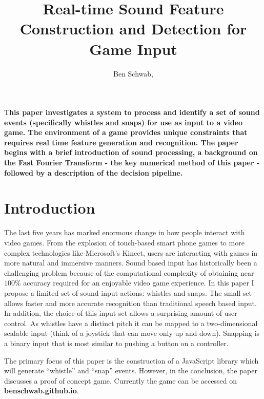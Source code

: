 \documentclass[DIV=calc, paper=a4, fontsize=11pt, twocolumn]{scrartcl}   %
\title{Real-time Sound Feature Construction and Detection for Game Input } %
\author{Ben Schwab, } %
\date{} %
\newcommand{\initial}[1]{ %
\lettrine[lines=3,lhang=0.3,nindent=0em]{
\color{DarkGoldenrod}
{\textsf{#1}}}{}}
\begin{document}
\maketitle %

\thispagestyle{fancy} %


\initial{T}\textbf{his paper investigates a system to process and identify a set of sound events (specifically whistles and snaps) for use as input to a video game. The environment of a game provides unique constraints that requires real time feature generation and recognition. The paper begins with a brief introduction of sound processing, a background on the Fast Fourier Transform - the key numerical method of this paper - followed by a description of the decision pipeline. }


\section*{Introduction}

\par The last five years has marked enormous change in how people interact with video games. From the explosion of touch-based smart phone games to more complex technologies like Microsoft's Kinect, users are interacting with games in more natural and immersive manners. Sound based input has historically been a challenging problem because of the computational complexity of obtaining near $100\%$ accuracy required for an enjoyable video game experience. In this paper I propose a limited set of sound input actions: whistles and snaps. The small set allows faster and more accurate recognition than traditional speech based input. In addition, the choice of this input set allows a surprising amount of user control. As whistles have a distinct pitch it can be mapped to a two-dimensional scalable input (think of a joystick that can move only up and down). Snapping is a binary input that is most similar to pushing a button on a controller.
\par The primary focus of this paper is the construction of a JavaScript library which will generate ``whistle'' and ``snap'' events. However, in the conclusion, the paper discusses a proof of concept game. Currently the game can be accessed on \textbf{benschwab.github.io}.
\par
\end{document}
